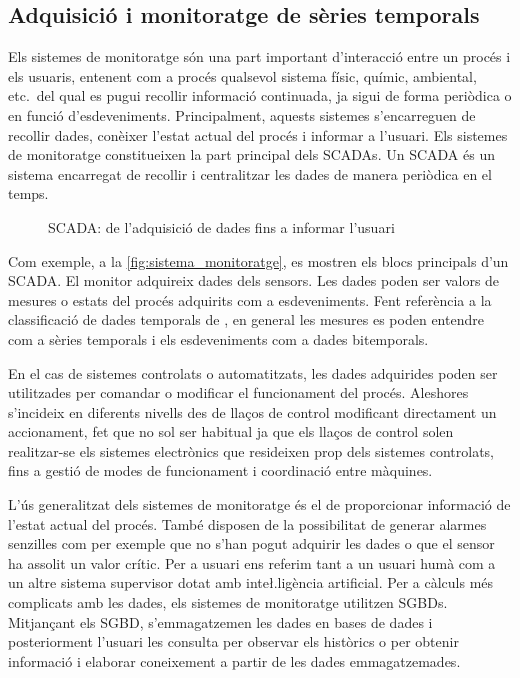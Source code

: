 





\subsection{Adquisició i monitoratge de sèries temporals}

Els sistemes de monitoratge són una part important d'interacció entre
un procés i els usuaris, entenent com a procés qualsevol sistema
físic, químic, ambiental, etc.\ del qual es pugui recollir informació
continuada, ja sigui de forma periòdica o en funció
d'esdeveniments. Principalment, aquests sistemes s'encarreguen de
recollir dades, conèixer l'estat actual del procés i informar a
l'usuari. Els sistemes de monitoratge constitueixen la part principal
dels \glspl{SCADA}. Un \gls{SCADA} és un sistema encarregat de recollir i
centralitzar les dades de manera periòdica en el temps.



\begin{figure}[tp]
  \begin{center}
    \scriptsize 
    
  \end{center}
  \caption{\gls{SCADA}: de l'adquisició de dades fins a informar l'usuari}
  \label{fig:sistema_monitoratge}
\end{figure}


Com exemple, a la \autoref{fig:sistema_monitoratge}, es mostren els
blocs principals d'un \gls{SCADA}. El monitor adquireix
dades dels sensors. Les dades poden ser valors de mesures o estats del
procés adquirits com a esdeveniments. Fent referència a la
classificació de dades temporals de \textcite{assfalg08:thesis}, en
general les mesures es poden entendre com a sèries temporals i els
esdeveniments com a dades bitemporals.

En el cas de sistemes controlats o automatitzats, les dades adquirides
poden ser utilitzades per comandar o modificar el funcionament del
procés. Aleshores s'incideix en diferents nivells des de llaços de
control modificant directament un accionament, fet que no sol ser
habitual ja que els llaços de control solen realitzar-se els sistemes
electrònics que resideixen prop dels sistemes controlats, fins a
gestió de modes de funcionament i coordinació entre màquines.

L'ús generalitzat dels sistemes de monitoratge és el de proporcionar
informació de l'estat actual del procés. També disposen de la
possibilitat de generar alarmes senzilles com per exemple que no s'han
pogut adquirir les dades o que el sensor ha assolit un valor
crític. Per a usuari ens referim tant a un usuari humà com a un altre
sistema supervisor dotat amb inte\l.ligència artificial.
%
Per a càlculs més complicats amb les dades, els sistemes de
monitoratge utilitzen \glspl{SGBD}. Mitjançant els \gls{SGBD},
s'emmagatzemen les dades en bases de dades i posteriorment l'usuari
les consulta per observar els històrics o per obtenir informació i
elaborar coneixement a partir de les dades emmagatzemades.

